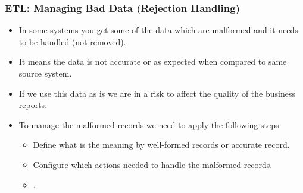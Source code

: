 
\begin{frame}
	\frametitle{ETL: Managing Bad Data (Rejection Handling)}
	\begin{itemize}[<+->]
		\item In some systems you get some of the data which are malformed and it needs to be handled (not removed).
		\item It means the data is not accurate or as expected when compared to same source system. 
		\item If we use this data as is we are in a risk to affect the quality of the business reports.
		\item To manage the malformed records we need to apply the following steps
		\begin{itemize}[<+->]
			\item  Define what is the meaning by well-formed records or accurate record. 
			\item  Configure which actions needed to handle the malformed records.
			\item  {}.			
			
		\end{itemize}
	\end{itemize}
\end{frame}


